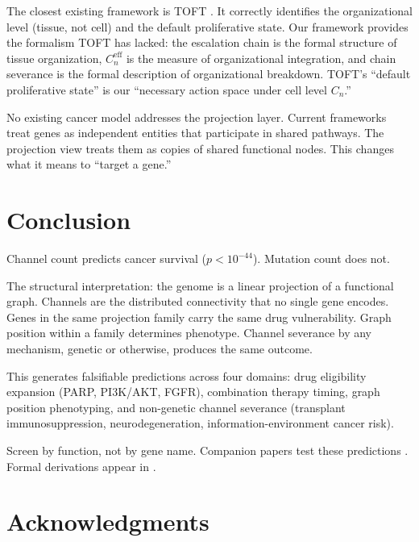 \documentclass[11pt]{article}
\begin{document}
The closest existing framework is TOFT \cite{Sonnenschein2000}.
It correctly identifies the organizational level (tissue, not cell)
and the default proliferative state. Our framework provides the
formalism TOFT has lacked: the escalation chain is the formal
structure of tissue organization, $C_n^{\mathrm{eff}}$ is the
measure of organizational integration, and chain severance is
the formal description of organizational breakdown. TOFT's
``default proliferative state'' is our ``necessary action space
under cell level $C_n$.''

No existing cancer model addresses the projection layer. Current
frameworks treat genes as independent entities that participate in
shared pathways. The projection view treats them as copies of shared
functional nodes. This changes what it means to ``target a gene.''

\section{Conclusion}
\label{sec:conclusion}

Channel count predicts cancer survival ($p < 10^{-44}$). Mutation
count does not.

The structural interpretation: the genome is a linear projection
of a functional graph. Channels are the distributed connectivity
that no single gene encodes. Genes in the same projection family
carry the same drug vulnerability. Graph position within a family
determines phenotype. Channel severance by any mechanism, genetic
or otherwise, produces the same outcome.

This generates falsifiable predictions across four domains:
drug eligibility expansion (PARP, PI3K/AKT, FGFR), combination
therapy timing, graph position phenotyping, and non-genetic
channel severance (transplant immunosuppression, neurodegeneration,
information-environment cancer risk).

Screen by function, not by gene name. Companion papers test these
predictions \cite{McCarthy2026f, McCarthy2026h}. Formal derivations
appear in \cite{McCarthy2026a, McCarthy2026b, McCarthy2026c,
McCarthy2026d}.

\section*{Acknowledgments}
\end{document}
